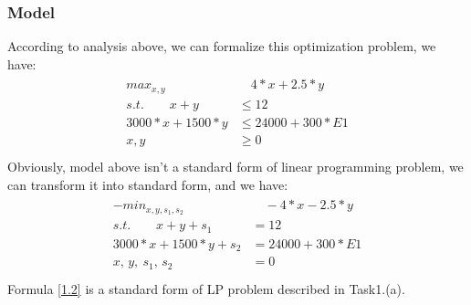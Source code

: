 \documentclass{article}
\begin{document}
        \subsubsection{Model}
            According to analysis above, we can formalize  this optimization problem, we have:
            \begin{align}\label{1.1}
            \begin{split}  
                max_{x,y} &\quad 4*x + 2.5*y \\
                s.t.\qquad x + y &\leq 12 \\
                3000*x + 1500*y &\leq 24000 + 300*E1 \\
                x,y &\geq 0 \\
            \end{split}    
            \end{align}      
            Obviously, model above isn't a standard form of linear programming problem, we can transform it into standard form, and we have:
            \begin{align}\label{1.2}
            \begin{split}  
                -min_{x,y,s_1,s_2} &\quad -4*x - 2.5*y \\
                s.t.\qquad x + y + s_1 &= 12 \\
                3000*x + 1500*y +s_2 &= 24000 + 300*E1 \\
                x,\,y,\:s_1,\,s_2 &= 0 \\
            \end{split}    
            \end{align}      
            Formula \eqref{1.2} is a standard form of LP problem described in Task1.(a).
\end{document}
